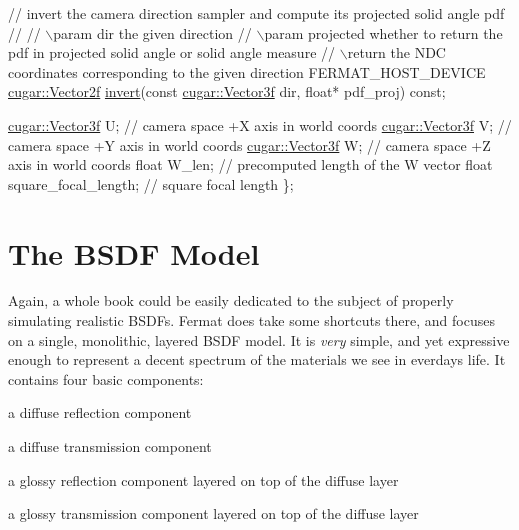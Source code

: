 \begin{DoxyParagraph}{}
\begin{DoxyCode}
   \textcolor{comment}{// invert the camera direction sampler and compute its projected solid angle pdf}
   \textcolor{comment}{//}
   \textcolor{comment}{// \(\backslash\)param dir               the given direction}
   \textcolor{comment}{// \(\backslash\)param projected         whether to return the pdf in projected solid angle or solid angle measure}
   \textcolor{comment}{// \(\backslash\)return                  the NDC coordinates corresponding to the given direction}
   FERMAT\_HOST\_DEVICE
   \hyperlink{structcugar_1_1_vector}{cugar::Vector2f} \hyperlink{struct_camera_sampler_a347623323319a7111f933d4af6ac2d19}{invert}(\textcolor{keyword}{const} \hyperlink{structcugar_1_1_vector}{cugar::Vector3f} dir, \textcolor{keywordtype}{float}* pdf\_proj) \textcolor{keyword}{
      const};

   \hyperlink{structcugar_1_1_vector}{cugar::Vector3f} U;                      \textcolor{comment}{// camera space +X axis in world coords}
   \hyperlink{structcugar_1_1_vector}{cugar::Vector3f} V;                      \textcolor{comment}{// camera space +Y axis in world coords}
   \hyperlink{structcugar_1_1_vector}{cugar::Vector3f} W;                      \textcolor{comment}{// camera space +Z axis in world coords}
   \textcolor{keywordtype}{float}           W\_len;                  \textcolor{comment}{// precomputed length of the W vector}
   \textcolor{keywordtype}{float}           square\_focal\_length;    \textcolor{comment}{// square focal length}
\};
\end{DoxyCode}

\end{DoxyParagraph}
\hypertarget{_overture_page_BSDFSection}{}\section{The B\+S\+D\+F Model}\label{_overture_page_BSDFSection}
\begin{DoxyParagraph}{}
Again, a whole book could be easily dedicated to the subject of properly simulating realistic B\+S\+D\+Fs. Fermat does take some shortcuts there, and focuses on a single, monolithic, layered B\+S\+DF model. It is {\itshape very} simple, and yet expressive enough to represent a decent spectrum of the materials we see in everday\textquotesingle{}s life. It contains four basic components\+: 
\end{DoxyParagraph}
\begin{DoxyParagraph}{}

\begin{DoxyItemize}
\item a diffuse reflection component
\item a diffuse transmission component
\item a glossy reflection component layered on top of the diffuse layer
\item a glossy transmission component layered on top of the diffuse layer 
\end{DoxyItemize}
\end{DoxyParagraph}
